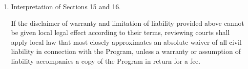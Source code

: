 \begin{enumerate}
\item Interpretation of Sections 15 and 16.

If the disclaimer of warranty and limitation of liability provided
above cannot be given local legal effect according to their terms,
reviewing courts shall apply local law that most closely approximates
an absolute waiver of all civil liability in connection with the
Program, unless a warranty or assumption of liability accompanies a
copy of the Program in return for a fee.

\end{enumerate}
\label{txt:licenseEnd}
\normalsize


